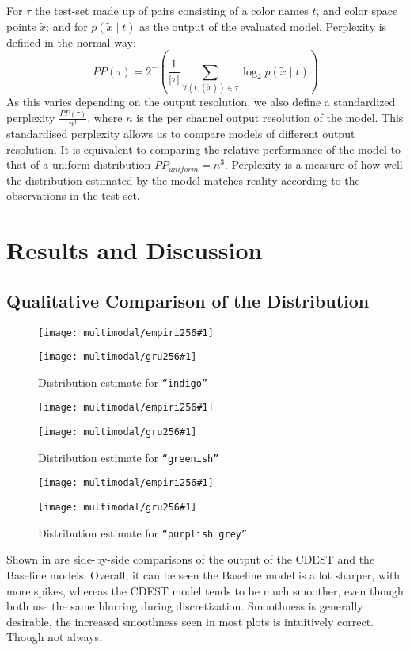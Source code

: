 \documentclass[11pt,letterpaper]{article}
\begin{document}
For $\tau$ the test-set made up of pairs consisting of a color names $t$, and color space points $\tilde{x}$;
and for $p(\tilde{x}\mid t)$ as the output of the evaluated model.
Perplexity is defined in the normal way:
\[
 PP(\tau) = 2^-{\left(
 	\frac{1}{|\tau|} 
 	\sum_{
	 		\forall(t,(\tilde{x})) \in \tau}
 	 \log_2 p(\tilde{x}\mid t)\right)}
\]
As this varies depending on the output resolution,
we also define a standardized perplexity $\frac{PP(\tau)}{n^3}$, where $n$ is the per channel output resolution of the model.
This standardised perplexity allows us to compare models of different output resolution.
It is equivalent to comparing the relative performance of the model to that of a uniform distribution $PP_{uniform}=n^3$.
Perplexity is a measure of how well the distribution estimated by the model matches reality according to the observations in the test set.


\section{Results and Discussion}\label{sec:results-and-discussion}

\subsection{Qualitative Comparison of the Distribution}\label{resultsdistributions}

\newcommand{\multimodalfig}[2]{
	\begin{figure}
		\texttt{[image: multimodal/empiri256\#1]}
		
		\vspace{3mm}
		
		\texttt{[image: multimodal/gru256\#1]}	
		\caption{\label{fig#1} Distribution estimate for \mbox{\texttt{``#2''}}}
	\end{figure}
}

\multimodalfig{indigo}{indigo}
\multimodalfig{greenish}{greenish}
\multimodalfig{purplishgrey}{purplish grey}


Shown in  are side-by-side comparisons of the output of the CDEST and the Baseline models.
Overall, it can be seen the Baseline model is a lot sharper, with more spikes,
whereas the CDEST model tends to be much smoother, even though both use the same blurring during discretization.
Smoothness is generally desirable, the increased smoothness seen in most plots is intuitively correct.
Though not always.
\end{document}
